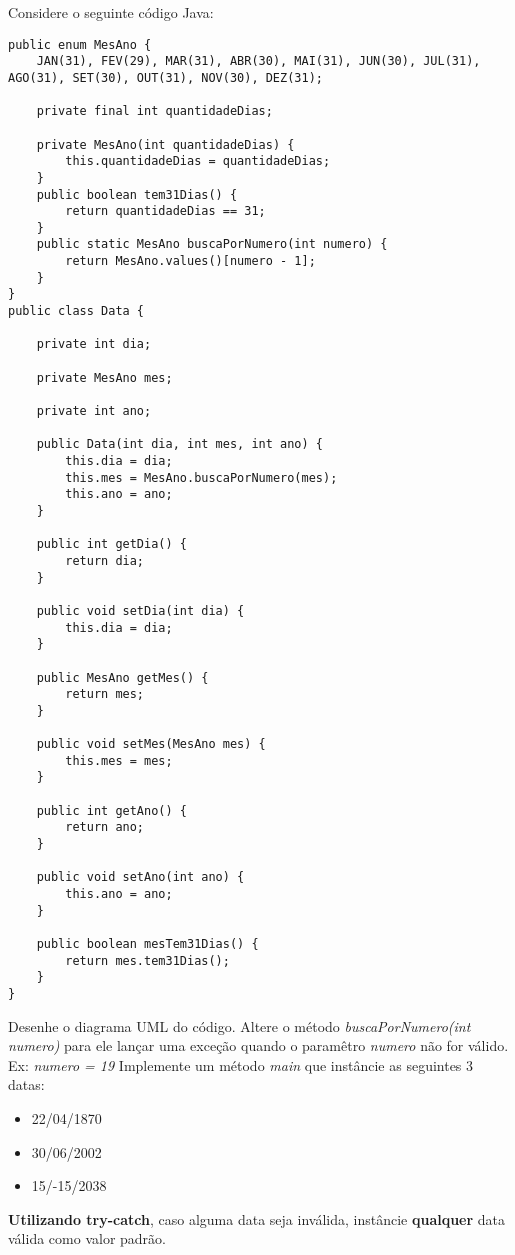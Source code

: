 \documentclass{lib/eng_softdoc}
\begin{document}
\problem Considere o seguinte código Java: 

\vspace{0.5cm}
\begin{lstlisting}
public enum MesAno {
	JAN(31), FEV(29), MAR(31), ABR(30), MAI(31), JUN(30), JUL(31), AGO(31), SET(30), OUT(31), NOV(30), DEZ(31);

	private final int quantidadeDias;

	private MesAno(int quantidadeDias) {
		this.quantidadeDias = quantidadeDias;
	}
	public boolean tem31Dias() {
		return quantidadeDias == 31;
	}
	public static MesAno buscaPorNumero(int numero) {
		return MesAno.values()[numero - 1];
	}
}
public class Data {

	private int dia;

	private MesAno mes;

	private int ano;

	public Data(int dia, int mes, int ano) {
		this.dia = dia;
		this.mes = MesAno.buscaPorNumero(mes);
		this.ano = ano;
	}

	public int getDia() {
		return dia;
	}

	public void setDia(int dia) {
		this.dia = dia;
	}

	public MesAno getMes() {
		return mes;
	}

	public void setMes(MesAno mes) {
		this.mes = mes;
	}

	public int getAno() {
		return ano;
	}

	public void setAno(int ano) {
		this.ano = ano;
	}

	public boolean mesTem31Dias() {
		return mes.tem31Dias();
	}
}
\end{lstlisting}
\subproblem Desenhe o diagrama UML do código.  
\vspace{0.5cm}
\subproblem Altere o método \textit{buscaPorNumero(int numero)} para ele lançar uma exceção quando o paramêtro \textit{numero} não 
for válido. Ex: \textit{numero = 19}
\vspace{0.5cm}
\subproblem 
Implemente um método \textit{main} que instâncie as seguintes 3 datas:
\begin{itemize}
	\item 22/04/1870
	\item 30/06/2002
	\item 15/-15/2038 
\end{itemize}
\textbf{Utilizando try-catch}, caso alguma data seja inválida, instâncie \textbf{qualquer} data válida como valor padrão. 

\vspace{0.5cm}
\newpage
\end{document}
